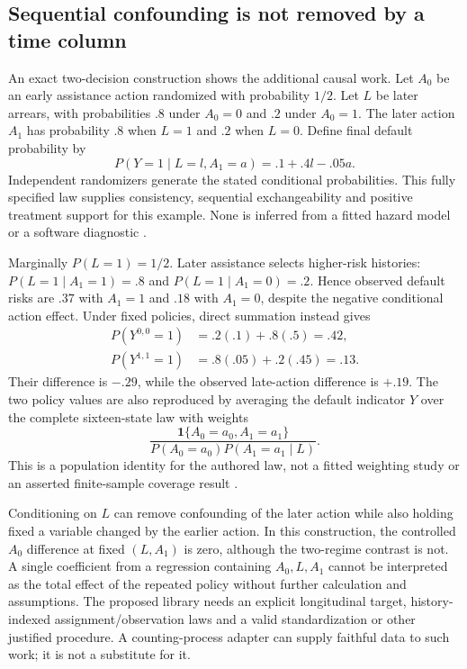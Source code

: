 \subsection{Sequential confounding is not removed by a time column}

An exact two-decision construction shows the additional causal work. Let
$A_0$ be an early assistance action randomized with probability $1/2$.
Let $L$ be later arrears, with probabilities $.8$ under $A_0=0$ and $.2$
under $A_0=1$. The later action $A_1$ has probability $.8$ when $L=1$ and
$.2$ when $L=0$. Define final default probability by
\[
 P(Y=1\mid L=l,A_1=a)=.1+.4l-.05a.
\]
Independent randomizers generate the stated conditional probabilities. This
fully specified law supplies consistency, sequential exchangeability and
positive treatment support for this example. None is inferred from a fitted
hazard model or a software diagnostic \citep{exec14_survival_exact}.

Marginally $P(L=1)=1/2$. Later assistance selects higher-risk histories:
$P(L=1\mid A_1=1)=.8$ and $P(L=1\mid A_1=0)=.2$. Hence observed default
risks are $.37$ with $A_1=1$ and $.18$ with $A_1=0$, despite the negative
conditional action effect. Under fixed policies, direct summation instead gives
\[
 \begin{split}
 P(Y^{0,0}=1)&=.2(.1)+.8(.5)=.42,\\
 P(Y^{1,1}=1)&=.8(.05)+.2(.45)=.13.
 \end{split}
\]
Their difference is $-.29$, while the observed late-action difference is
$+.19$. The two policy values are also reproduced by averaging the default indicator $Y$ over the complete
sixteen-state law with weights
\[
 \frac{\mathbf 1\{A_0=a_0,A_1=a_1\}}
 {P(A_0=a_0)P(A_1=a_1\mid L)}.
\]
This is a population identity for the authored law, not a fitted weighting
study or an asserted finite-sample coverage result
\citep{exec14_survival_exact}.

Conditioning on $L$ can remove confounding of the later action while also
holding fixed a variable changed by the earlier action. In this construction,
the controlled $A_0$ difference at fixed $(L,A_1)$ is zero, although the
two-regime contrast is not. A single coefficient from a regression containing
$A_0,L,A_1$ cannot be interpreted as the total effect of the repeated policy
without further calculation and assumptions. The proposed library needs an
explicit longitudinal target, history-indexed assignment/observation laws
and a valid standardization or other justified procedure. A counting-process
adapter can supply faithful data to such work; it is not a substitute for it.

